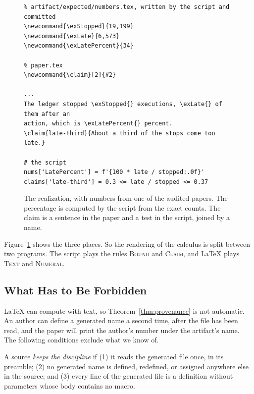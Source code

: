 \documentclass[acmsmall,nonacm,screen]{acmart}
\newcommand{\claim}[2]{#2}
\begin{document}
\begin{figure}[t]
\small
\begin{verbatim}
% artifact/expected/numbers.tex, written by the script and committed
\newcommand{\exStopped}{19,199}
\newcommand{\exLate}{6,573}
\newcommand{\exLatePercent}{34}

% paper.tex
\newcommand{\claim}[2]{#2}

...
The ledger stopped \exStopped{} executions, \exLate{} of them after an
action, which is \exLatePercent{} percent.
\claim{late-third}{About a third of the stops come too late.}

# the script
nums['LatePercent'] = f'{100 * late / stopped:.0f}'
claims['late-third'] = 0.3 <= late / stopped <= 0.37
\end{verbatim}
\caption{The realization, with numbers from one of the audited papers. The percentage is
computed by the script from the exact counts. The claim is a sentence in the paper and a
test in the script, joined by a name.}
\label{fig:listing}
\end{figure}

Figure~\ref{fig:listing} shows the three places. So the rendering of the calculus is split
between two programs. The script plays the rules \textsc{Bound} and \textsc{Claim}, and LaTeX
plays \textsc{Text} and \textsc{Numeral}.

\subsection{What Has to Be Forbidden}

LaTeX can compute with text, so Theorem~\ref{thm:provenance} is not automatic. An author
can define a generated name a second time, after the file has been read, and the paper will
print the author's number under the artifact's name. The following conditions exclude what
we know of.

\begin{definition}[Discipline]
\label{def:discipline}
A source \emph{keeps the discipline} if (1) it reads the generated file once, in its
preamble; (2) no generated name is defined, redefined, or assigned anywhere else in the
source; and (3) every line of the generated file is a definition without parameters whose
body contains no macro.
\end{definition}
\end{document}
